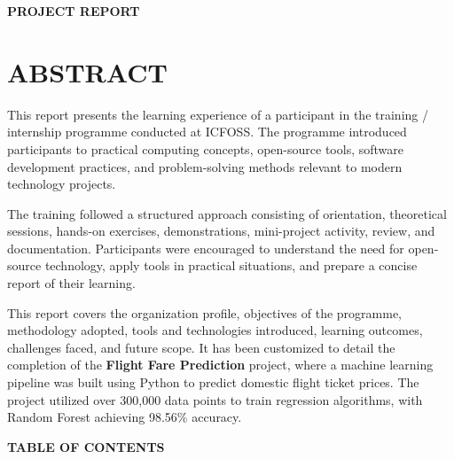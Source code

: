 \documentclass[12pt, a4paper]{article}
\begin{document}
\begin{titlepage}
    \vspace*{\fill}
    \begin{center}
        \textbf{\huge\color{headerblue} PROJECT REPORT}
    \end{center}
    \vspace*{\fill}
\end{titlepage}

\newpage
\setcounter{page}{2}

\section{ABSTRACT}

This report presents the learning experience of a participant in the training / internship programme conducted at ICFOSS. The programme introduced participants to practical computing concepts, open-source tools, software development practices, and problem-solving methods relevant to modern technology projects.

The training followed a structured approach consisting of orientation, theoretical sessions, hands-on exercises, demonstrations, mini-project activity, review, and documentation. Participants were encouraged to understand the need for open-source technology, apply tools in practical situations, and prepare a concise report of their learning.

This report covers the organization profile, objectives of the programme, methodology adopted, tools and technologies introduced, learning outcomes, challenges faced, and future scope. It has been customized to detail the completion of the \textbf{Flight Fare Prediction} project, where a machine learning pipeline was built using Python to predict domestic flight ticket prices. The project utilized over 300,000 data points to train regression algorithms, with Random Forest achieving 98.56\% accuracy.

\newpage

\begin{center}
    \Large\bfseries\color{headerblue} TABLE OF CONTENTS
\end{center}
\end{document}

